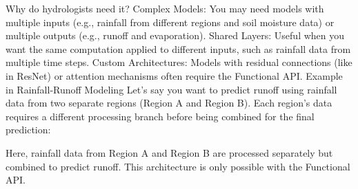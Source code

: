 Why do hydrologists need it?
Complex Models: You may need models with multiple inputs (e.g., rainfall from different regions and soil moisture data) or multiple outputs (e.g., runoff and evaporation).
Shared Layers: Useful when you want the same computation applied to different inputs, such as rainfall data from multiple time steps.
Custom Architectures: Models with residual connections (like in ResNet) or attention mechanisms often require the Functional API.
Example in Rainfall-Runoff Modeling
Let’s say you want to predict runoff using rainfall data from two separate regions (Region A and Region B). Each region’s data requires a different processing branch before being combined for the final prediction:

Here, rainfall data from Region A and Region B are processed separately but combined to predict runoff. This architecture is only possible with the Functional API. 